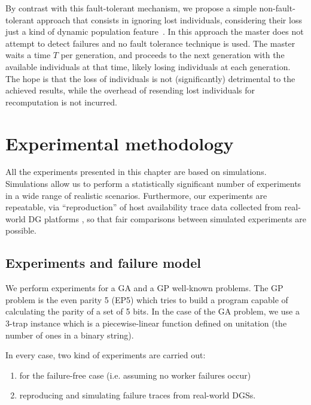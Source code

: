 \documentclass[graybox]{sty/svmult}
\begin{document}
By contrast with this fault-tolerant mechanism, we
propose a simple non-fault-tolerant approach that consists in ignoring lost
individuals, considering their loss just a kind of dynamic population
feature~\cite{dynamic-population-gp,plague,luke:2003:gecco,dynamic-population-variation-gp}.
In this approach the master does not attempt to detect failures and
no fault tolerance technique is used. The master waits a time $T$ per
generation, and proceeds to the next generation with the available individuals at that time,
likely losing individuals at each generation. The hope is that the
loss of individuals is not (significantly) detrimental to the achieved results,
while the overhead of resending
lost individuals for recomputation is not incurred.

\section{Experimental methodology}
\label{experiments-setup}

All the experiments presented in this chapter are based on simulations. Simulations allow us to perform a statistically
significant number of experiments in a wide range of realistic scenarios. Furthermore, our experiments are repeatable, via
``reproduction'' of host availability trace data collected from real-world DG platforms \cite{traces-dgc}, so that fair comparisons
between simulated experiments are possible.

\subsection{Experiments and failure model}

We perform experiments for a GA and a GP well-known problems. The GP problem is the even parity 5 (EP5) which
tries to build a program capable of calculating the parity of a set of 5 bits. In the case of the GA problem, we use a 3-trap instance
\cite{ackley:trap} which is a piecewise-linear function defined on unitation (the number of ones in a binary string).

In every case, two kind of experiments are carried out:
\begin{enumerate}
    \item for the failure-free case (i.e. assuming no worker failures occur)
    \item reproducing and simulating failure traces from real-world DGSs.
\end{enumerate}
\end{document}

